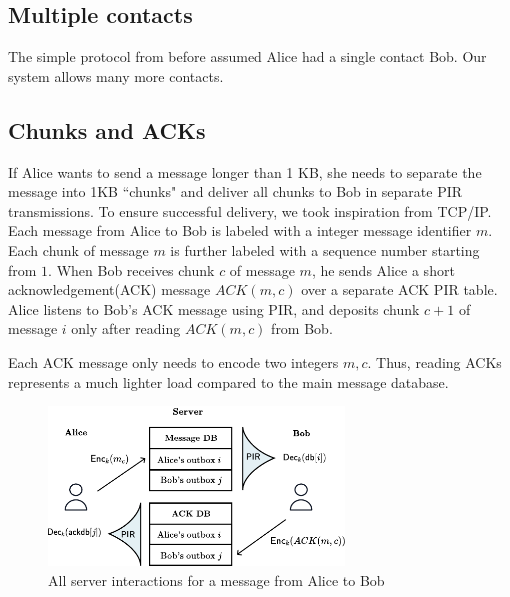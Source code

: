\subsection{Multiple contacts}

The simple protocol from before assumed Alice had a single contact Bob. Our system allows many more contacts. 

\subsection{Chunks and ACKs}

If Alice wants to send a message longer than 1 KB, she needs to separate the message into 1KB ``chunks" and deliver all chunks to Bob in separate PIR transmissions. To ensure successful delivery, we took inspiration from TCP/IP. Each message from Alice to Bob is labeled with a integer message identifier $m$. Each chunk of message $m$ is further labeled with a sequence number starting from $1$. When Bob receives chunk $c$ of message $m$, he sends Alice a short acknowledgement(ACK) message $ACK(m, c)$ over a separate ACK PIR table. Alice listens to Bob's ACK message using PIR, and deposits chunk $c + 1$ of message $i$ only after reading $ACK(m, c)$ from Bob.

Each ACK message only needs to encode two integers $m, c$. Thus, reading ACKs represents a much lighter load compared to the main message database.


\begin{figure}
    \centering
    \includegraphics[width=0.7\textwidth]{ACK.pdf}
\caption{All server interactions for a message from Alice to Bob}
\label{fig:highlevelpir}
\end{figure}

